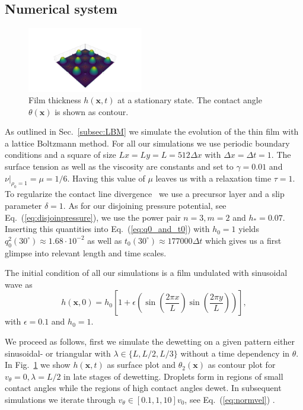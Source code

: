 \documentclass[twocolumn,amsmath,amssymb,showpacs,pre,nofootinbib,superscriptaddress]{revtex4-1} %
\begin{document}
\subsection{Numerical system}
\begin{figure}
    \centering
    \includegraphics[width=0.45\textwidth]{Figures/makie_try2.png}
    \caption{Film thickness $h(\mathbf{x},t)$ at a stationary state. 
    The contact angle $\theta(\mathbf{x})$ is shown as contour.}
    \label{fig:handtheta}
\end{figure}
As outlined in Sec.~\ref{subsec:LBM} we simulate the evolution of the thin film with a lattice Boltzmann method.
For all our simulations we use periodic boundary conditions and a square of size $Lx = Ly = L = 512 \Delta x$ with $\Delta x = \Delta t = 1$.
The surface tension as well as the viscosity are constants and set to $\gamma = 0.01$ and $\nu|_{\rho_0=1} = \mu = 1/6$.
Having this value of $\mu$ leaves us with a relaxation time $\tau = 1$.
To regularize the contact line divergence~\cite{huh1971hydrodynamic} we use a precursor layer and a slip parameter $\delta = 1$. 
As for our disjoining pressure potential, see Eq.~(\ref{eq:disjoinpressure}), we use the power pair $n=3, m=2$ and $h_{\ast} = 0.07$.
Inserting this quantities into Eq.~(\ref{eq:q0_and_t0}) with $h_0 = 1$ yields $q_0^2(30^{\circ}) \approx 1.68\cdot10^{-2}$ as well as $t_0(30^{\circ}) \approx 177000\Delta t$ which gives us a first glimpse into relevant length and time scales.

The initial condition of all our simulations is a film undulated with sinusoidal wave as
\begin{equation}\label{eq:hinitial}
    h(\mathbf{x},0) = h_0 \left[1 + \epsilon \left(\sin\left(\frac{2\pi x}{L}\right)\sin\left(\frac{2\pi y}{L}\right)\right)\right],
\end{equation}
with $\epsilon = 0.1$ and $h_0 = 1$.

We proceed as follows, first we simulate the dewetting on a given pattern either sinusoidal- or triangular with $\lambda \in \{L, L/2, L/3\}$ without a time dependency in $\theta$.
In Fig.~\ref{fig:handtheta} we show $h(\mathbf{x},t)$ as surface plot and $\theta_2(\mathbf{x})$ as contour plot for $v_{\theta} = 0, \lambda = L/2$ in late stages of dewetting.
Droplets form in regions of small contact angles while the regions of high contact angles dewet.
In subsequent simulations we iterate through $v_{\theta} \in [0.1, 1, 10]v_0$, see Eq.~(\ref{eq:normvel}) .  
\end{document}
